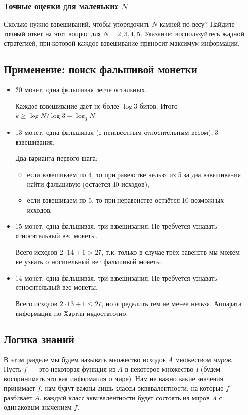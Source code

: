 \documentclass[12pt]{article}
\begin{document}
\subsubsection{Точные оценки для маленьких $N$}
\begin{exercise}
Сколько нужно взвешиваний, чтобы упорядочить \(N\) камней по весу? 
Найдите точный ответ на этот вопрос для \(N = 2, 3, 4, 5\). Указание: воспользуйтесь жадной стратегией, при которой каждое взвешивание приносит максимум информации.
\end{exercise}

\subsection{Применение: поиск фальшивой монетки}
\begin{itemize}
\item 20 монет, одна фальшивая легче остальных.

Каждое взвешивание даёт не более \(\log 3\) битов. 
Итого \(k\ge\log N/\log 3 = \log_3 N\).

\item 13 монет, одна фальшивая (с неизвестным относительным весом), 3 взвешивания.

Два варианта первого шага:
\begin{itemize}
\item если взвешиваем по 4, то при равенстве нельзя из 5 за два взвешивания найти фальшивую (остаётся 10 исходов),
\item если взвешиваем по 5, то при неравенстве остаётся 10 возможных исходов.
\end{itemize}

\item 15 монет, одна фальшивая, три взвешивания. Не требуется узнавать относительный вес монеты.

Всего исходов \(2\cdot 14 + 1 > 27\), т.к. только в случае трёх равенств мы можем не узнать относительный вес фальшивой монеты.

\item 14 монет, одна фальшивая, три взвешивания. Не требуется узнавать относительный вес монеты.

Всего исходов \(2\cdot 13 + 1 \le 27\), но определить тем не менее нельзя. Аппарата информации по Хартли недостаточно.

\end{itemize}

\subsection{Логика знаний}
В этом разделе мы будем называть множество исходов $A$ множеством \emph{миров}.
Пусть $f$~--- это некоторая функция из $A$ в некоторое множество $I$ (будем воспринимать это как информация о мире).
Нам не важно какие значения принимает $f$, нам будут важны лишь классы эквивалентности, на которые $f$ разбивает $A$:
каждый класс эквивалентности будет состоять из миров $A$ с одинаковым значением $f$.
\end{document}
